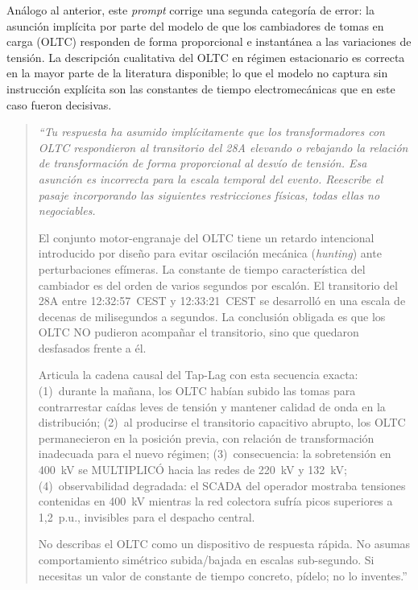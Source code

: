 Análogo al anterior, este \textit{prompt} corrige una segunda categoría
de error: la asunción implícita por parte del modelo de que los
cambiadores de tomas en carga (OLTC) responden de forma proporcional e
instantánea a las variaciones de tensión. La descripción cualitativa del
OLTC en régimen estacionario es correcta en la mayor parte de la
literatura disponible; lo que el modelo no captura sin instrucción
explícita son las constantes de tiempo electromecánicas que en este
caso fueron decisivas.

\begin{quote}
    \itshape\small
    ``Tu respuesta ha asumido implícitamente que los transformadores
    con OLTC respondieron al transitorio del 28A elevando o rebajando la
    relación de transformación de forma proporcional al desvío de
    tensión. Esa asunción es incorrecta para la escala temporal del
    evento. Reescribe el pasaje incorporando las siguientes
    restricciones físicas, todas ellas no negociables.

    \medskip
    El conjunto motor-engranaje del OLTC tiene un retardo intencional
    introducido por diseño para evitar oscilación mecánica
    (\textit{hunting}) ante perturbaciones efímeras. La constante de
    tiempo característica del cambiador es del orden de varios segundos
    por escalón. El transitorio del 28A entre 12:32:57~CEST y
    12:33:21~CEST se desarrolló en una escala de decenas de
    milisegundos a segundos. La conclusión obligada es que los OLTC NO
    pudieron acompañar el transitorio, sino que quedaron desfasados
    frente a él.

    \medskip
    Articula la cadena causal del Tap-Lag con esta secuencia exacta:
    (1)~durante la mañana, los OLTC habían subido las tomas para
    contrarrestar caídas leves de tensión y mantener calidad de onda en
    la distribución; (2)~al producirse el transitorio capacitivo
    abrupto, los OLTC permanecieron en la posición previa, con relación
    de transformación inadecuada para el nuevo régimen;
    (3)~consecuencia: la sobretensión en 400~kV se MULTIPLICÓ hacia las
    redes de 220~kV y 132~kV; (4)~observabilidad degradada: el SCADA
    del operador mostraba tensiones contenidas en 400~kV mientras la
    red colectora sufría picos superiores a 1,2~p.u., invisibles para
    el despacho central.

    \medskip
    No describas el OLTC como un dispositivo de respuesta rápida. No
    asumas comportamiento simétrico subida/bajada en escalas
    sub-segundo. Si necesitas un valor de constante de tiempo concreto,
    pídelo; no lo inventes.''
\end{quote}

